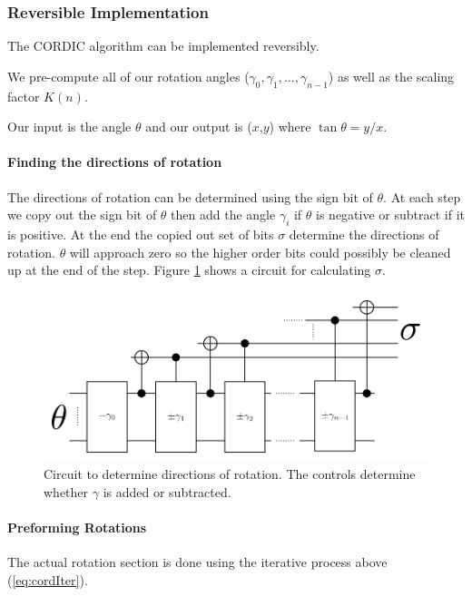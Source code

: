     \subsubsection{Reversible Implementation}
        The CORDIC algorithm can be implemented reversibly.

        We pre-compute all of our rotation angles ($\gamma_0,\gamma_1,\dotsc,\gamma_{n-1}$) as well as the scaling factor $K(n)$.

        Our input is the angle $\theta$ and our output is ($x$,$y$) where $\tan\theta = y/x$.

        \paragraph{Finding the directions of rotation}
            The directions of rotation can be determined using the sign bit of $\theta$.  
            At each step we copy out the sign bit of $\theta$ then add the angle $\gamma_i$ if $\theta$ is negative or subtract if it is positive.
            At the end the copied out set of bits $\sigma$ determine the directions of rotation.
            $\theta$ will approach zero so the higher order bits could possibly be cleaned up at the end of the step.
            Figure \ref{fig:CORDICDirections} shows a circuit for calculating $\sigma$.
            \begin{figure}[ht]
                \capstart
                \centering
                \includegraphics[width=\textwidth]{images/CORDICDirections} 
                \caption{Circuit to determine directions of rotation.  The controls determine whether $\gamma$ is added or subtracted.}
                \label{fig:CORDICDirections}
            \end{figure}

        \paragraph{Preforming Rotations}
            The actual rotation section is done using the iterative process above (\ref{eq:cordIter}).

